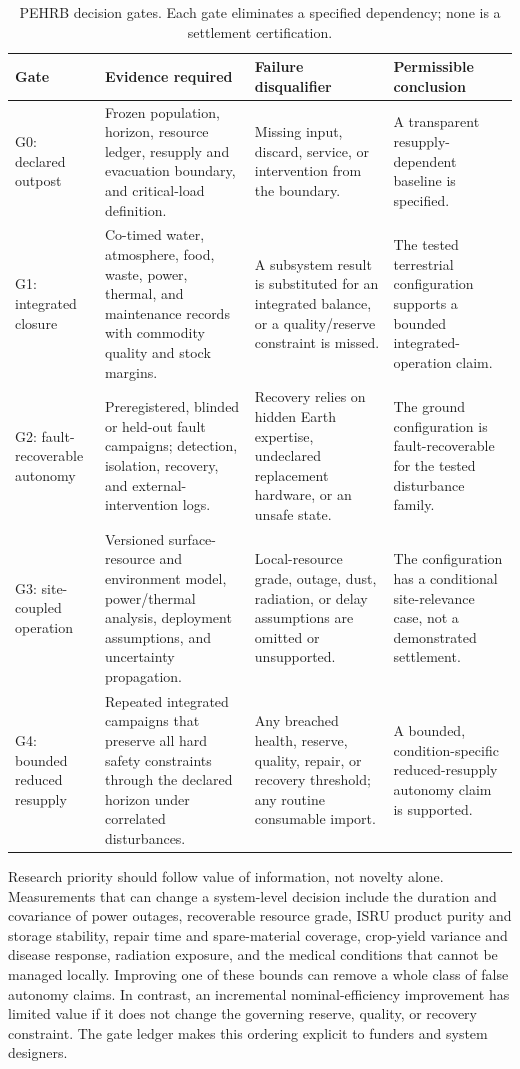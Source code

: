 \documentclass[10pt,conference]{IEEEtran}
\begin{document}
\begin{table}[!t]
\caption{PEHRB decision gates. Each gate eliminates a specified dependency; none is a settlement certification.}
\label{tab:decision-gates}
\centering
\footnotesize
\begin{tabular}{@{}p{}p{}p{}p{}@{}}
\toprule
Gate & Evidence required & Failure disqualifier & Permissible conclusion \\
\midrule
G0: declared outpost & Frozen population, horizon, resource ledger, resupply and evacuation boundary, and critical-load definition. & Missing input, discard, service, or intervention from the boundary. & A transparent resupply-dependent baseline is specified. \\
G1: integrated closure & Co-timed water, atmosphere, food, waste, power, thermal, and maintenance records with commodity quality and stock margins. & A subsystem result is substituted for an integrated balance, or a quality/reserve constraint is missed. & The tested terrestrial configuration supports a bounded integrated-operation claim. \\
G2: fault-recoverable autonomy & Preregistered, blinded or held-out fault campaigns; detection, isolation, recovery, and external-intervention logs. & Recovery relies on hidden Earth expertise, undeclared replacement hardware, or an unsafe state. & The ground configuration is fault-recoverable for the tested disturbance family. \\
G3: site-coupled operation & Versioned surface-resource and environment model, power/thermal analysis, deployment assumptions, and uncertainty propagation. & Local-resource grade, outage, dust, radiation, or delay assumptions are omitted or unsupported. & The configuration has a conditional site-relevance case, not a demonstrated settlement. \\
G4: bounded reduced resupply & Repeated integrated campaigns that preserve all hard safety constraints through the declared horizon under correlated disturbances. & Any breached health, reserve, quality, repair, or recovery threshold; any routine consumable import. & A bounded, condition-specific reduced-resupply autonomy claim is supported. \\
\bottomrule
\end{tabular}
\end{table}

Research priority should follow value of information, not novelty alone. Measurements that can change a system-level decision include the duration and covariance of power outages, recoverable resource grade, ISRU product purity and storage stability, repair time and spare-material coverage, crop-yield variance and disease response, radiation exposure, and the medical conditions that cannot be managed locally. Improving one of these bounds can remove a whole class of false autonomy claims. In contrast, an incremental nominal-efficiency improvement has limited value if it does not change the governing reserve, quality, or recovery constraint. The gate ledger makes this ordering explicit to funders and system designers.
\end{document}
